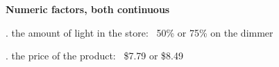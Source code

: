 
\begin{frame}\frametitle{}
	
	{\LARGE\textbf{{\color{purple} Numeric factors, both continuous}}}
	
	\vspace{24pt}
		. the amount of light in the store: \quad\, 50\% or 75\% on the dimmer
		
	\vspace{12pt}
	
		\pause
		. the price of the product: \qquad\qquad\, \$7.79 or \$8.49
	
\end{frame}

{
\begin{frame}\frametitle{}
\end{frame}}

{
\begin{frame}\frametitle{}
\end{frame}}

